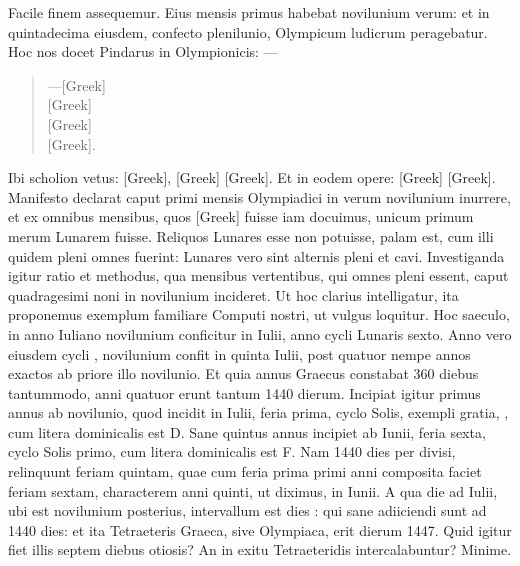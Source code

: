 Facile finem assequemur.
Eius mensis primus habebat novilunium verum:
et in quintadecima eiusdem, confecto plenilunio, Olympicum ludicrum
peragebatur.
Hoc nos docet Pindarus in Olympionicis: ---
\begin{verse}
---\textgreek{[Greek]}\\
\textgreek{[Greek]}\\
\textgreek{[Greek]}\\
\textgreek{[Greek]}.
\end{verse}
Ibi scholion vetus: \textgreek{[Greek]}, \textgreek{[Greek]}
\textgreek{[Greek]}.
Et in eodem opere: \textgreek{[Greek]}
\textgreek{[Greek]}.
Manifesto declarat caput primi mensis
Olympiadici in verum novilunium inurrere, et ex omnibus mensibus,
quos \textgreek{[Greek]} fuisse iam docuimus, unicum primum merum
Lunarem fuisse.
Reliquos Lunares esse non potuisse, palam est, cum illi
quidem pleni omnes fuerint: Lunares vero sint alternis pleni et cavi.
Investiganda
igitur ratio et methodus, qua  mensibus vertentibus,
qui omnes pleni essent, caput quadragesimi noni in novilunium
incideret.
Ut hoc clarius intelligatur, ita proponemus exemplum familiare
Computi nostri, ut vulgus loquitur.
Hoc saeculo, in anno Iuliano
novilunium conficitur in  Iulii, anno cycli Lunaris sexto.
Anno vero
eiusdem cycli , novilunium confit in quinta Iulii, post quatuor
nempe annos exactos ab priore illo novilunio.
Et quia annus Graecus
constabat 360 diebus tantummodo, anni quatuor erunt tantum 1440
dierum.
Incipiat igitur primus annus ab novilunio, quod incidit in 
Iulii, feria prima, cyclo Solis, exempli gratia,
 , cum litera dominicalis
est D.
Sane quintus annus incipiet ab  Iunii,
 feria sexta, cyclo Solis
primo, cum litera dominicalis est F.
Nam 1440 dies per  divisi,
relinquunt feriam quintam, quae cum feria prima primi anni composita
faciet feriam sextam, characterem anni quinti, ut diximus, in
  Iunii.
A qua die ad  Iulii, ubi est novilunium posterius,
 intervallum est
dies : qui sane adiiciendi sunt ad 1440 dies: et ita
 Tetraeteris Graeca,
sive Olympiaca, erit dierum 1447.
Quid igitur fiet illis septem diebus
otiosis?
An in exitu Tetraeteridis intercalabuntur?
Minime.
